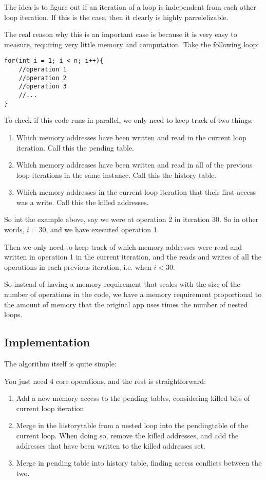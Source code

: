 \documentclass[12pt,twoside]{reedthesis}
\begin{document}
		The idea is to figure out if an iteration of a loop is independent from each other loop iteration. If this is the case, then it clearly is highly parrelelizable.

		The real reason why this is an important case is because it is very easy to measure, requiring very little memory and computation. Take the following loop:
\begin{lstlisting}
for(int i = 1; i < n; i++){
	//operation 1
	//operation 2
	//operation 3
	//...
}
\end{lstlisting}


		To check if this code runs in parallel, we only need to keep track of two things:

		\begin{enumerate}
			\item Which memory addresses have been written and read in the current loop iteration. Call this the pending table.
			\item Which memory addresses have been written and read in all of the previous loop iterations in the same instance. Call this the history table.
			\item Which memory addresses in the current loop iteration that their first access was a write. Call this the killed addresses.
		\end{enumerate}

		So int the example above, say we were at operation 2 in iteration 30. So in other words, $i=30$, and we have executed operation 1.

		Then we only need to keep track of which memory addresses were read and written in operation 1 in the current iteration, and the reads and writes of all the operations in each previous iteration, i.e. when $i < 30$.

		So instead of having a memory requirement that scales with the size of the number of operations in the code, we have a memory requirement proportional to the amount of memory that the original app uses times the number of nested loops.

		\subsection{Implementation}

		The algorithm itself is quite simple:

		You just need 4 core operations, and the rest is straightforward:

		\begin{enumerate}
			\item Add a new memory access to the pending tables, considering killed bits of current loop iteration
			\item Merge in the historytable from a nested loop into the pendingtable of the current loop. When doing so, remove the killed addresses, and add the addresses that have been written to the killed addresses set.
			\item Merge in pending table into history table, finding access conflicts between the two.
		\end{enumerate}
\end{document}
